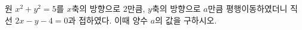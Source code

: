 원 $x^2+y^2=5$를 $x$축의 방향으로 $2$만큼, $y$축의 방향으로 $a$만큼 평행이동하였더니 직선 $2x-y-4=0$과 접하였다. 이때 양수 $a$의 값을 구하시오.
